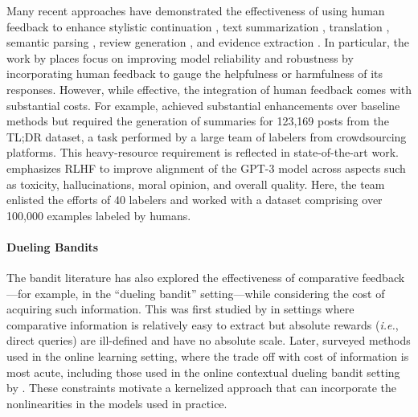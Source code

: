 \documentclass{article} \usepackage{iclr2023_conference,times}
\begin{document}
Many recent approaches have demonstrated the effectiveness of using human feedback to enhance stylistic continuation \citep{ziegler2019fine}, text summarization \citep{stiennon2020}, translation \citep{Kreutzer2018}, semantic parsing \citep{LawrenceAndReizler2018}, review generation \citep{Cho2018}, and evidence extraction \citep{Perez2019}. In particular, the work by \cite{bai2022training} places focus on improving model reliability and robustness by incorporating human feedback to gauge the helpfulness or harmfulness of its responses. However, while effective, the integration of human feedback comes with substantial costs. For example, \citet{stiennon2020} achieved substantial enhancements over baseline methods but required the generation of summaries for 123,169 posts from the TL;DR dataset, a task performed by a large team of labelers
from crowdsourcing platforms.
This heavy-resource requirement is reflected in state-of-the-art work. \citet{ouyang2022training} emphasizes RLHF to improve alignment of the GPT-3 model across aspects such as toxicity, hallucinations, moral opinion, and overall quality. Here, the team enlisted the efforts of 40 labelers and worked with a dataset comprising over 100,000 examples labeled by humans.







\vspace{-1mm}
\paragraph{Dueling Bandits}
The bandit literature has also explored the effectiveness of comparative feedback---for example, in the  ``dueling bandit'' setting---while considering the cost of acquiring such information. This was first studied by \citet{yue2012} in settings where comparative information is relatively easy to extract but absolute rewards (\textit{i.e.}, direct queries) are ill-defined and have no absolute scale. Later, \citet{bengs2021preferencebased} surveyed methods used in the online learning setting, where the trade off with cost of information is most acute, including those used in the online contextual dueling bandit setting by \citet{dudk2015contextual}.
These constraints motivate a kernelized approach that can incorporate the nonlinearities in the models used in practice.

\vspace{-1mm}
\end{document}
